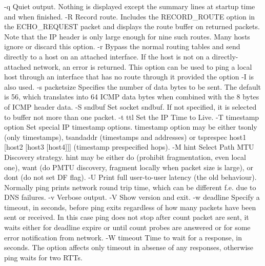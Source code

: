 -q Quiet output. Nothing is displayed except the summary lines at startup time and when finished.
-R Record route. Includes the RECORD_ROUTE option in the ECHO_REQUEST packet and displays the route buffer on returned packets. Note that the IP header is only large enough for nine such routes. Many hosts ignore or discard this option.
-r Bypass the normal routing tables and send directly to a host on an attached interface. If the host is not on a directly-attached network, an error is returned. This option can be used to ping a local host through an interface that has no route through it provided the option -I is also used.
-s packetsize Specifies the number of data bytes to be sent. The default is 56, which translates into 64 ICMP data bytes when combined with the 8 bytes of ICMP header data.
-S sndbuf Set socket sndbuf. If not specified, it is selected to buffer not more than one packet.
-t ttl Set the IP Time to Live.
-T timestamp option Set special IP timestamp options. timestamp option may be either tsonly (only timestamps), tsandaddr (timestamps and addresses) or tsprespec host1 [host2 [host3 [host4]]] (timestamp prespecified hops).
-M hint Select Path MTU Discovery strategy. hint may be either do (prohibit fragmentation, even local one), want (do PMTU discovery, fragment locally when packet size is large), or dont (do not set DF flag).
-U Print full user-to-user latency (the old behaviour). Normally ping prints network round trip time, which can be different f.e. due to DNS failures.
-v Verbose output.
-V Show version and exit.
-w deadline Specify a timeout, in seconds, before ping exits regardless of how many packets have been sent or received. In this case ping does not stop after count packet are sent, it waits either for deadline expire or until count probes are answered or for some error notification from network.
-W timeout Time to wait for a response, in seconds. The option affects only timeout in absense of any responses, otherwise ping waits for two RTTs.

